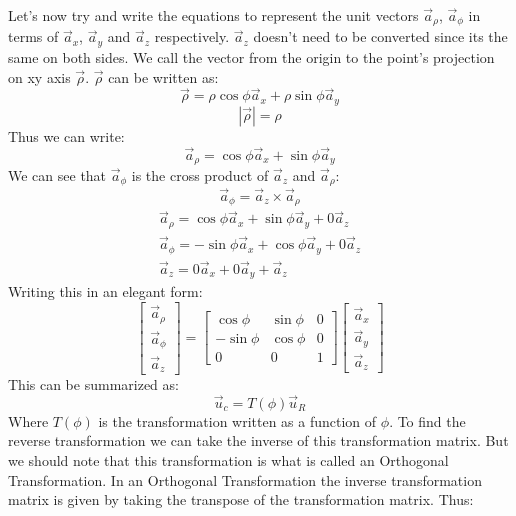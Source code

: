             Let's now try and write the equations to represent the unit vectors $\vec{a}_\rho$, $\vec{a}_\phi$ in terms of $\vec{a}_x$, $\vec{a}_y$ and $\vec{a}_z$ respectively. $\vec{a}_z$ doesn't need to be converted since its the same on both sides.
            We call the vector from the origin to the point's projection on xy axis $\vec{\rho}$. $\vec{\rho}$ can be written as:
            $$\vec{\rho} = \rho\cos\phi\vec{a}_x + \rho\sin\phi\vec{a}_y$$
            $$|\vec{\rho}| = \rho$$
            Thus we can write:
            $$\vec{a}_\rho = \cos\phi\vec{a}_x + \sin\phi\vec{a}_y$$
            We can see that $\vec{a}_\phi$ is the cross product of $\vec{a}_z$ and $\vec{a}_\rho$:
            $$\vec{a}_\phi = \vec{a}_z\times\vec{a}_\rho$$
            \begin{align}
                \vec{a}_\rho = \cos\phi\vec{a}_x + \sin\phi\vec{a}_y + 0\vec{a}_z \\ 
                \vec{a}_\phi = -\sin\phi\vec{a}_x + \cos\phi\vec{a}_y + 0\vec{a}_z \\
                \vec{a}_z = 0\vec{a}_x + 0\vec{a}_y + \vec{a}_z
            \end{align}
            Writing this in an elegant form:
            \begin{equation}\label{eq:rcstoccsunit}
                \begin{bmatrix}
                    \vec{a}_\rho \\ \vec{a}_\phi \\ \vec{a}_z 
                \end{bmatrix} = 
                \begin{bmatrix}
                    \cos\phi & \sin\phi & 0 \\
                    -\sin\phi & \cos\phi & 0 \\
                    0 & 0 & 1
                \end{bmatrix}
                \begin{bmatrix}
                    \vec{a}_x \\
                    \vec{a}_y \\
                    \vec{a}_z
                \end{bmatrix}
            \end{equation}
            This can be summarized as:
            $$\vec{u}_c = T\left(\phi\right)\vec{u}_R$$
            Where $T\left(\phi\right)$ is the transformation written as a function of $\phi$. To find the reverse transformation we can take the inverse of this transformation matrix. But we should note that this transformation is what is called an Orthogonal Transformation. In an Orthogonal Transformation the inverse transformation matrix is given by taking the transpose of the transformation matrix. Thus:
